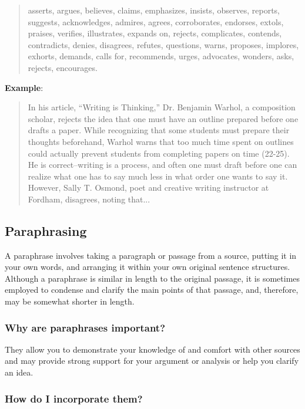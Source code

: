 \begin{quote}asserts, argues, believes, claims, emphasizes, insists, observes, reports, suggests, acknowledges, admires, agrees, corroborates, endorses, extols, praises, verifies, illustrates, expands on, rejects, complicates, contends, contradicts, denies, disagrees, refutes, questions, warns, proposes, implores, exhorts, demands, calls for, recommends, urges, advocates, wonders, asks, rejects, encourages.\end{quote}
 
 
\textbf{Example}:
 
 \begin{quote}
In his article, ``Writing is Thinking,'' Dr. Benjamin Warhol, a composition scholar, rejects the idea that one must have an outline prepared before one drafts a paper. While recognizing that some students must prepare their thoughts beforehand, Warhol warns that too much time spent on outlines could actually prevent students from completing papers on time (22-25). He is correct--writing  is a process, and often one must draft before one  can realize what one has to say much less in what order one wants to say it. However, Sally T. Osmond, poet and  creative writing instructor at Fordham, disagrees, noting that... \end{quote}

\subsection{Paraphrasing}

A paraphrase involves taking a paragraph or passage from a source, putting it in your own words, and arranging it within your own original sentence structures. Although a paraphrase is similar in length to the original passage, it is sometimes employed to condense and clarify the main points of that passage, and, therefore, may be somewhat shorter in length.

\subsubsection{Why are paraphrases important?}

They allow you to demonstrate your knowledge of and comfort with other sources and may provide strong support for your argument or analysis or help you clarify an idea.

\subsubsection{How do I incorporate them?}

